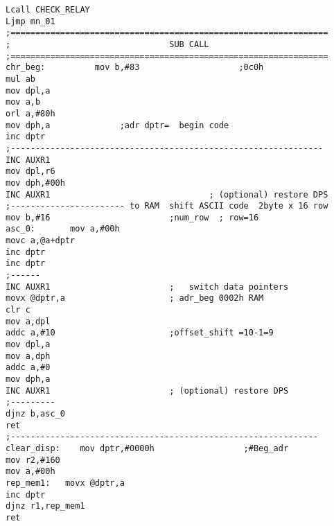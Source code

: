 \begin{lstlisting}
Lcall CHECK_RELAY
Ljmp mn_01 
;================================================================
;                                SUB CALL  
;================================================================ 
chr_beg:          mov b,#83                    ;0c0h
mul ab
mov dpl,a
mov a,b
orl a,#80h
mov dph,a              ;adr dptr=  begin code 
inc dptr
;---------------------------------------------------------------
INC AUXR1
mov dpl,r6
mov dph,#00h
INC AUXR1                                ; (optional) restore DPS  
;----------------------- to RAM  shift ASCII code  2byte x 16 row  
mov b,#16                        ;num_row  ; row=16
asc_0:       mov a,#00h
movc a,@a+dptr
inc dptr
inc dptr
;------
INC AUXR1                        ;   switch data pointers
movx @dptr,a                     ; adr_beg 0002h RAM
clr c  
mov a,dpl
addc a,#10                       ;offset_shift =10-1=9
mov dpl,a
mov a,dph
addc a,#0
mov dph,a
INC AUXR1                        ; (optional) restore DPS  
;---------
djnz b,asc_0
ret
;--------------------------------------------------------------
clear_disp:    mov dptr,#0000h                  ;#Beg_adr                            
mov r2,#160
mov a,#00h            
rep_mem1:   movx @dptr,a
inc dptr
djnz r1,rep_mem1
ret


\end{lstlisting}